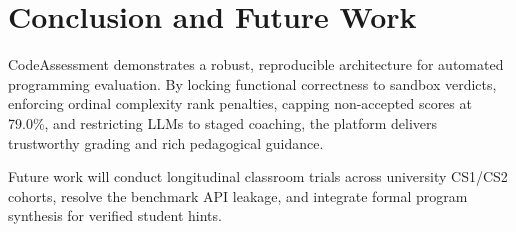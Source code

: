 \documentclass[conference]{IEEEtran}
\begin{document}
\section{Conclusion and Future Work}
CodeAssessment demonstrates a robust, reproducible architecture for automated programming evaluation. By locking functional correctness to sandbox verdicts, enforcing ordinal complexity rank penalties, capping non-accepted scores at 79.0\%, and restricting LLMs to staged coaching, the platform delivers trustworthy grading and rich pedagogical guidance.

Future work will conduct longitudinal classroom trials across university CS1/CS2 cohorts, resolve the benchmark API leakage, and integrate formal program synthesis for verified student hints.



\end{document}
